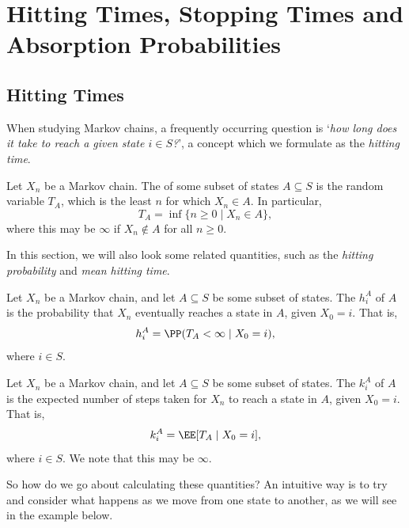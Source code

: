 \section{Hitting Times, Stopping Times and Absorption Probabilities}

\subsection{Hitting Times}

When studying Markov chains, a frequently occurring question is `\emph{how long does it take to reach a given state $i \in S$?}', a concept which we formulate as the \emph{hitting time}.

\begin{definition}
	Let $X_n$ be a Markov chain.
	The  of some subset of states $A \subseteq S$ is the random variable $T_A$, which is the least $n$ for which $X_n \in A$.
	In particular,
	$$
	T_A = \inf\{n \geq 0 \mid X_n \in A\},
	$$
	where this may be $\infty$ if $X_n \not \in A$ for all $n \geq 0$.
\end{definition}

In this section, we will also look some related quantities, such as the \emph{hitting probability} and \emph{mean hitting time}.

\begin{definition}
	Let $X_n$ be a Markov chain, and let $A \subseteq S$ be some subset of states.
	The  $h^A_i$ of $A$ is the probability that $X_n$ eventually reaches a state in $A$, given $X_0 = i$. That is,
	$$
	h^A_i = \PP(T_A < \infty \mid X_0 = i),
	$$
	where $i \in S$.
\end{definition}

\begin{definition}
	Let $X_n$ be a Markov chain, and let $A \subseteq S$ be some subset of states.
	The  $k^A_i$ of $A$ is the expected number of steps taken for $X_n$ to reach a state in $A$, given $X_0 = i$. That is,
	$$
	k^A_i = \EE[T_A \mid X_0 = i],
	$$
	where $i \in S$. We note that this may be $\infty$.
\end{definition}

So how do we go about calculating these quantities? An intuitive way is to try and consider what happens as we move from one state to another, as we will see in the example below.

